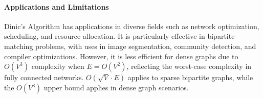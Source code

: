 \paragraph{Applications and Limitations}

Dinic’s Algorithm has applications in diverse fields such as network optimization, scheduling, and resource allocation. It is particularly effective in bipartite matching problems, with uses in image segmentation, community detection, and compiler optimizations. However, it is less efficient for dense graphs due to $O(V^3)$ complexity when $E = O(V^2)$, reflecting the worst-case complexity in fully connected networks. $O(\sqrt{V} \cdot E)$ applies to sparse bipartite graphs, while the $O(V^3)$ upper bound applies in dense graph scenarios.

